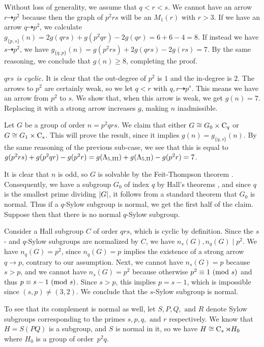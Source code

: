 Without loss of generality, we assume that $q < r < s$.
We cannot have an arrow $r \dashrightarrow p^2$ because then the graph of $p^2 r s$ will be an $M_1(r)$ with $r > 3$.
If we have an arrow $q \dashrightarrow p^2$, we calculate $g_{\{p, s\}}(n) = 2g(qrs) + g(p^2 q r) - 2g(qr) = 6 + 6 - 4 = 8.$ If instead we have $s \dashrightarrow p^2$, we have $g_{\{q, p\}}(n) = g(p^2 r s) + 2g(qrs) - 2g(rs) = 7$.
By the same reasoning, we conclude that $g(n) \ge 8$, completing the proof.

 \emph{$qrs$ is cyclic.} It is clear that the out-degree of $p^2$ is $1$ and the in-degree is $2$.
The arrows to $p^2$ are certainly weak, so we let $q < r$ with $q, r \dashrightarrow p^s$.
This means we have an arrow from $p^2$ to $s$.
We show that, when this arrow is weak, we get $g(n) = 7$.
Replacing it with a strong arrow increases $g$, making $n$ inadmissible.

Let $G$ be a group of order $n = p^2 q r s$.
We claim that either $G \cong G_0 \times \operatorname{C}_{q}$ or $G \cong G_1\times \operatorname{C}_{s}$.
This will prove the result, since it implies $g(n) = g_{\{q, s\}}(n)$.
By the same reasoning of the previous sub-case, we see that this is equal to $g(p^2 r s) + g(p^2 q r) - g(p^2 r) = g(\Lambda_{5,\text{III}}) + g(\Lambda_{5,\text{II}}) - g(p^2 r) = 7$.

It is clear that $n$ is odd, so $G$ is solvable by the Feit-Thompson theorem {\cite{oddsolve}}.
Consequently, we have a subgroup $G_0$ of index $q$ by Hall's theorems {\cite[Thm.~3.13]{fgt}}, and since $q$ is the smallest prime dividing $\lvert G\rvert$, it follows from a standard theorem {\cite[Prob.~1A.1]{fgt}} that $G_0$ is normal.
Thus if a $q$-Sylow subgroup is normal, we get the first half of the claim.
Suppose then that there is no normal $q$-Sylow subgroup.

Consider a Hall subgroup $C$ of order $qrs$, which is cyclic by definition.
Since the $s$- and $q$-Sylow subgroups are normalized by $C$, we have $n_s(G), n_q(G) \mid p^2$.
We have $n_q(G) = p^2$, since $n_q(G) = p$ implies the existence of a strong arrow \nopagebreak[4] $q \rightarrow p$, contrary to our assumption.
Next, we cannot have $n_s(G) = p$ because $s > p$, and we cannot have $n_s(G) = p^2$ because otherwise $p^2 \equiv 1 \ (\mathrm{mod} \ s)$ and thus $p \equiv s - 1 \ (\mathrm{mod} \ s)$.
Since $s > p$, this implies $p = s - 1$, which is impossible since $(s, p) \neq (3, 2)$.
We conclude that the $s$-Sylow subgroup is normal.


To see that its complement is normal as well, let $S, P, Q,\text{ and }R$ denote Sylow subgroups corresponding to the primes $s, p, q,\text{ and }r$ respectively.
We know that $H = S(PQ)$ is a subgroup, and $S$ is normal in it, so we have $H \cong \operatorname{C}_{s} \rtimes H_0$ where $H_0$ is a group of \mbox{order $p^2 q$.}

